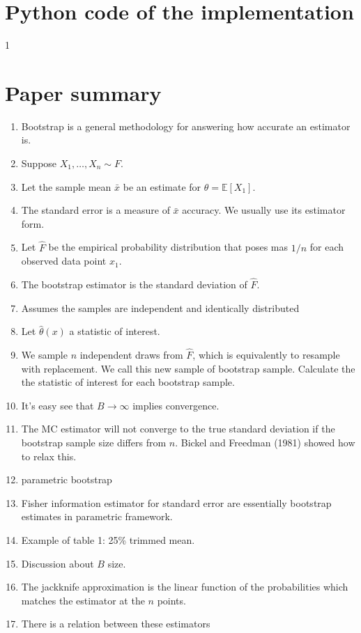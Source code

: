 \documentclass[a4paper,10pt, notitlepage]{report}
\newcommand{\ev}{\mathbb{E}}
\begin{document}
\section*{Python code of the implementation}



\def\mynumber{0}
\if\mynumber1

\section*{Paper summary}

\begin{enumerate}
  \item Bootstrap is a general methodology for answering how accurate an
  estimator is. 
  \item Suppose $X_1, \dots, X_n \sim F.$
  \item Let the sample mean $\bar{x}$ be an estimate for $\theta = \ev[X_1]$.
  \item The standard error is a measure of $\bar{x}$ accuracy. We usually use its
  estimator form.
  \item Let $\hat{F}$ be the empirical probability distribution that poses mas
 $1/n$ for each observed data point $x_1$.
 \item The bootstrap estimator is the standard deviation of $\hat{F}$.
 \item Assumes the samples are independent and identically distributed
 \item Let $\hat{\theta}(x)$ a statistic of interest.
 \item We sample $n$ independent draws from $\hat{F}$, which is equivalently
 to resample with replacement. We call this new sample of bootstrap sample.
 Calculate the the statistic of interest for each bootstrap sample. 
 \item It's easy see that $B \to \infty$ implies convergence. 
 \item The MC estimator will not converge to the true standard deviation if
 the bootstrap sample size differs from $n$. Bickel and Freedman (1981) showed
 how to relax this. 
 \item parametric bootstrap
 \item Fisher information estimator for standard error are essentially
 bootstrap estimates in parametric framework.
 \item Example of table 1: 25\% trimmed mean. 
 \item Discussion about $B$ size.
 \item The jackknife approximation is the linear function of the probabilities
which matches the estimator at the $n$ points. 
  \item There is a relation between these estimators
\end{enumerate}

\fi



\end{document}

